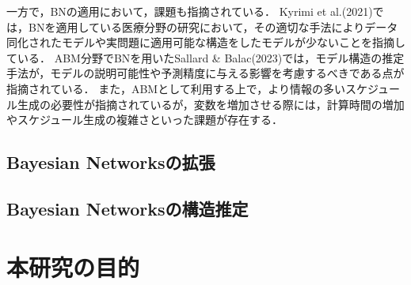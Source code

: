 一方で，BNの適用において，課題も指摘されている．
Kyrimi et al.(2021)\cite{Kyrimi2021}では，BNを適用している医療分野の研究において，その適切な手法によりデータ同化されたモデルや実問題に適用可能な構造をしたモデルが少ないことを指摘している．
ABM分野でBNを用いたSallard \& Balac(2023)\cite{Sallard2023}では，モデル構造の推定手法が，モデルの説明可能性や予測精度に与える影響を考慮するべきである点が指摘されている．
また，ABMとして利用する上で，より情報の多いスケジュール生成の必要性が指摘されている\cite{Ma2015}\cite{Ma2017}が，変数を増加させる際には，計算時間の増加やスケジュール生成の複雑さといった課題が存在する．

\subsection{Bayesian Networksの拡張}\label{2.2.3}

\subsection{Bayesian Networksの構造推定}\label{2.2.4}

\section{本研究の目的}\label{2.3}
